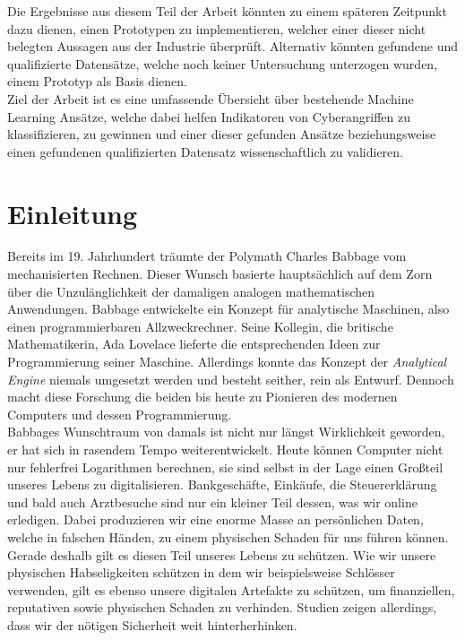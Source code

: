 \documentclass[
    12pt, %
    DIV10,
    ngerman, %
    a4paper, %
    oneside, %
    titlepage, %
    parskip=half, %
    headings=normal, %
    listof=totoc, %
    bibliography=totoc, %
    index=totoc, %
    captions=tableheading, %
    final %
]{scrreprt}
\def\mainmatter{%
    \pagenumbering{arabic}
    \setcounter{page}{1}
    \setcounter{section}{0}
    \renewcommand{\thesection}{\arabic{section}}
}%
\begin{document}
Die Ergebnisse aus diesem Teil der Arbeit könnten zu einem späteren Zeitpunkt dazu dienen, einen Prototypen zu implementieren, welcher einer dieser nicht belegten Aussagen aus der Industrie überprüft.
Alternativ könnten gefundene und qualifizierte Datensätze, welche noch keiner Untersuchung unterzogen wurden, einem Prototyp als Basis dienen.\\
\noindent Ziel der Arbeit ist es eine umfassende Übersicht über bestehende Machine Learning Ansätze, welche dabei helfen Indikatoren von Cyberangriffen zu klassifizieren, zu gewinnen und einer dieser gefunden Ansätze beziehungsweise einen gefundenen qualifizierten Datensatz wissenschaftlich zu validieren. 
\newpage
\tableofcontents
\mainmatter
\newpage
\chapter{Einleitung}
Bereits im 19. Jahrhundert träumte der Polymath Charles Babbage vom mechanisierten Rechnen. Dieser Wunsch basierte hauptsächlich auf dem Zorn über die Unzulänglichkeit der damaligen analogen mathematischen Anwendungen. Babbage entwickelte ein Konzept für analytische Maschinen, also einen programmierbaren Allzweckrechner. Seine Kollegin, die britische Mathematikerin, Ada Lovelace lieferte die entsprechenden Ideen zur Programmierung seiner Maschine. Allerdings konnte das Konzept der \emph{Analytical Engine} niemals umgesetzt werden und besteht seither, rein als Entwurf. Dennoch macht diese Forschung die beiden bis heute zu Pionieren des modernen Computers und dessen Programmierung.\\
Babbages Wunschtraum von damals ist nicht nur längst Wirklichkeit geworden, er hat sich in rasendem Tempo weiterentwickelt. Heute können Computer nicht nur fehlerfrei Logarithmen berechnen, sie sind selbst in der Lage einen Großteil unseres Lebens zu digitalisieren. Bankgeschäfte, Einkäufe, die Steuererklärung und bald auch Arztbesuche sind nur ein kleiner Teil dessen, was wir online erledigen. Dabei produzieren wir eine enorme Masse an persönlichen Daten, welche in falschen Händen, zu einem physischen Schaden für uns führen können. Gerade deshalb gilt es diesen Teil unseres Lebens zu schützen. Wie wir unsere physischen Habseligkeiten schützen in dem wir beispielsweise Schlösser verwenden, gilt es ebenso unsere digitalen Artefakte zu schützen, um finanziellen, reputativen sowie physischen Schaden zu verhinden. Studien zeigen allerdings, dass wir der nötigen Sicherheit weit hinterherhinken. 
\end{document}
